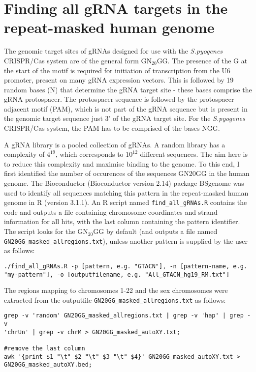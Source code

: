 \section{Finding all gRNA targets in the repeat-masked human genome}
\label{sec:GN20GG in genome}

The genomic target sites of gRNAs designed for use with the \textit{S.pyogenes} CRISPR/Cas system are of the general form GN$_{20}$GG. The presence of the G at the start of the motif is required for initiation of transcription from the U6 promoter, present on many gRNA expression vectors. This is followed by 19 random bases (N) that determine the gRNA target site - these bases comprise the gRNA protospacer. The protospacer sequence is followed by the protospacer-adjacent motif (PAM), which is not part of the gRNA sequence but is present in the genomic target sequence just 3' of the gRNA target site. For the \textit{S.pyogenes} CRISPR/Cas system, the PAM has to be comprised of the bases NGG. 

A gRNA library is a pooled collection of gRNAs. A random library has a complexity of $4^{19}$, which corresponds to $10^{12}$ different sequences. The aim here is to reduce this complexity and maximise binding to the genome. To this end, I first identified the number of occurences of the sequences GN20GG in the human genome. The Bioconductor (Bioconductor version 2.14) package BSgenome \citep{BSgenome} was used to identify all sequences matching this pattern in the repeat-masked human genome in R (version 3.1.1). An R script named \verb|find_all_gRNAs.R| contains the code and outputs a file containing chromosome coordinates and strand information for all hits, with the last column containing the pattern identifier. The script looks for the GN$_{20}$GG by default (and outputs a file named \verb|GN20GG_masked_allregions.txt|), unless another pattern is supplied by the user as follows:

\begin{lstlisting}
./find_all_gRNAs.R -p [pattern, e.g. "GTACN"], -n [pattern-name, e.g. "my-pattern"], -o [outputfilename, e.g. "All_GTACN_hg19_RM.txt"]
\end{lstlisting}

The regions mapping to chromosomes 1-22 and the sex chromosomes were extracted from the outputfile \verb|GN20GG_masked_allregions.txt| as follows:

\begin{lstlisting}
grep -v 'random' GN20GG_masked_allregions.txt | grep -v 'hap' | grep -v 
'chrUn' | grep -v chrM > GN20GG_masked_autoXY.txt;

#remove the last column
awk '{print $1 "\t" $2 "\t" $3 "\t" $4}' GN20GG_masked_autoXY.txt >
GN20GG_masked_autoXY.bed;
\end{lstlisting}

